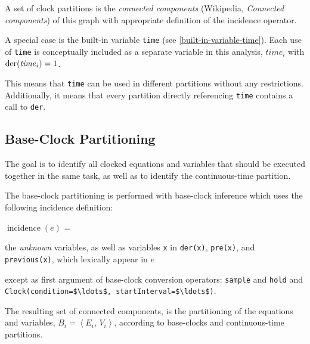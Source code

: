 A set of clock partitions is the \emph{connected components} (Wikipedia,
\emph{Connected components}) of this graph with appropriate definition of
the incidence operator.

A special case is the built-in variable \lstinline!time! (see \cref{built-in-variable-time}).
Each use of \lstinline!time! is conceptually included as a separate variable in this analysis, $\mathit{time}_i$ with $\text{\lstinline!der!}(\mathit{time}_{i}) = 1$.
\begin{nonnormative}
This means that \lstinline!time! can be used in different partitions without any restrictions.
Additionally, it means that every partition directly referencing \lstinline!time! contains a call to \lstinline!der!.
\end{nonnormative}

\subsection{Base-Clock Partitioning}\label{base-clock-partitioning}

The goal is to identify all clocked equations and variables that should
be executed together in the same task, as well as to identify the
continuous-time partition.

The base-clock partitioning is performed with base-clock inference which
uses the following incidence definition:

$\operatorname{incidence}(e)$ =
\begin{list}{}{\setlength{\leftmargin}{2em}\setlength{\topsep}{-\parskip}}
\item
the \emph{unknown} variables, as well as variables \lstinline!x! in \lstinline!der(x)!, \lstinline!pre(x)!, and \lstinline!previous(x)!, which lexically appear in $e$
\begin{list}{}{\setlength{\leftmargin}{2em}\setlength{\topsep}{-\parskip}}
\item
except as first argument of base-clock conversion operators: \lstinline!sample! and \lstinline!hold! and \lstinline!Clock(condition=$\ldots$, startInterval=$\ldots$)!.
\end{list}
\end{list}\vspace{\parskip}%

The resulting set of connected components, is the partitioning of the equations and variables, $B_{i} = \left\langle E_{i},\, V_{i} \right\rangle$, according to base-clocks and continuous-time partitions.

